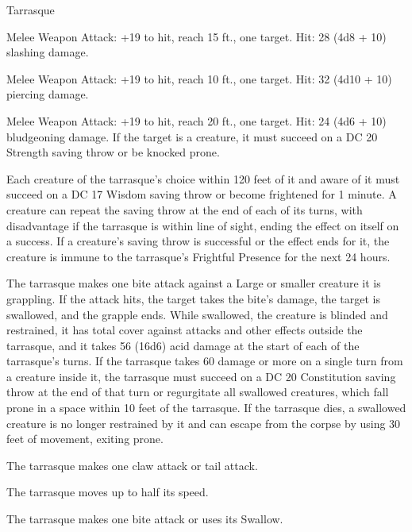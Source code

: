 \begin{monsterbox}{Tarrasque}
\begin{monsteraction}[Bite]
\end{monsteraction}
\begin{monsteraction}[Claw]
Melee Weapon Attack: +19 to hit, reach 15 ft., one target. Hit: 28 (4d8 + 10) slashing damage.
\end{monsteraction}
\begin{monsteraction}[Horns]
Melee Weapon Attack: +19 to hit, reach 10 ft., one target. Hit: 32 (4d10 + 10) piercing damage.
\end{monsteraction}
\begin{monsteraction}[Tail]
Melee Weapon Attack: +19 to hit, reach 20 ft., one target. Hit: 24 (4d6 + 10) bludgeoning damage. If the target is a creature, it must succeed on a DC 20 Strength saving throw or be knocked prone.
\end{monsteraction}
\begin{monsteraction}
Each creature of the tarrasque's choice within 120 feet of it and aware of it must succeed on a DC 17 Wisdom saving throw or become frightened for 1 minute. A creature can repeat the saving throw at the end of each of its turns, with disadvantage if the tarrasque is within line of sight, ending the effect on itself on a success. If a creature's saving throw is successful or the effect ends for it, the creature is immune to the tarrasque's Frightful Presence for the next 24 hours.
\end{monsteraction}
\begin{monsteraction}[Swallow]
The tarrasque makes one bite attack against a Large or smaller creature it is grappling. If the attack hits, the target takes the bite's damage, the target is swallowed, and the grapple ends. While swallowed, the creature is blinded and restrained, it has total cover against attacks and other effects outside the tarrasque, and it takes 56 (16d6) acid damage at the start of each of the tarrasque's turns.
If the tarrasque takes 60 damage or more on a single turn from a creature inside it, the tarrasque must succeed on a DC 20 Constitution saving throw at the end of that turn or regurgitate all swallowed creatures, which fall prone in a space within 10 feet of the tarrasque. If the tarrasque dies, a swallowed creature is no longer restrained by it and can escape from the corpse by using 30 feet of movement, exiting prone.
\end{monsteraction}
\begin{monsteraction}[Attack]
The tarrasque makes one claw attack or tail attack.
\end{monsteraction}
\begin{monsteraction}[Move]
The tarrasque moves up to half its speed.
\end{monsteraction}
\begin{monsteraction}
The tarrasque makes one bite attack or uses its Swallow.
\end{monsteraction}
\end{monsterbox}